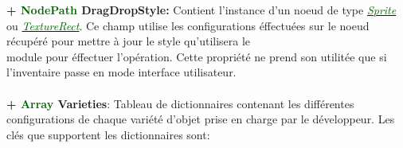 \documentclass[a4paper, 11pt]{article}
\begin{document}
	\textbf{+ \textcolor{darkgreen}{NodePath} DragDropStyle:} Contient l'instance d'un noeud de type
	\href{https://docs.godotengine.org/en/stable/classes/class_sprite.html}
	{\textit{\textcolor{darkgreen}{Sprite}}} ou
	\href{https://docs.godotengine.org/en/stable/classes/class_texturerect.html}
	{\textit{\textcolor{darkgreen}{TextureRect}}}. Ce champ utilise les configurations éffectuées sur le 
	noeud récupéré pour mettre à jour le style qu'utilisera le \\module pour éffectuer l'opération. Cette 
	propriété ne prend son utilitée que si l'inventaire passe en mode interface utilisateur.\\\\
	\textbf{+ \textcolor{darkgreen}{Array} \hypertarget{varieties}{Varieties}}: Tableau de dictionnaires 
	contenant les différentes configurations de chaque variété d'objet prise en charge par le développeur. 
	Les clés que supportent les dictionnaires sont:\\
\end{document}
